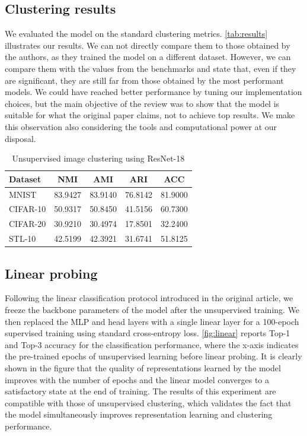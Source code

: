 \documentclass{article}
\begin{document}
\subsection{Clustering results}
We evaluated the model on the standard clustering metrics. \autoref{tab:results} illustrates our results. We can not directly compare them to those obtained by the authors, as they trained the model on a different dataset. However, we can compare them with the values from the benchmarks and state that, even if they are significant, they are still far from those obtained by the most performant models. We could have reached better performance by tuning our implementation choices, but the main objective of the review was to show that the model is suitable for what the original paper claims, not to achieve top results. We make this observation also considering the tools and computational power at our disposal.

\begin{table}[h!]
  \caption{Unsupervised image clustering using ResNet-18}
  \label{tab:results}
  \centering
  \begin{tabular}{lcccc}
    \toprule
    Dataset  & NMI    &  AMI     & ARI   & ACC  \\
    \midrule
    MNIST\cite{mnist}   & 83.9427 & 83.9140 & 76.8142 & 81.9000 \\
    CIFAR-10 \cite{cifar_10} & 50.9317 & 50.8450 & 41.5156 & 60.7300 \\
    CIFAR-20 & 30.9210 & 30.4974 & 17.8501 & 32.2400 \\
    STL-10 \cite{stl_10}  & 42.5199 & 42.3921 & 31.6741 & 51.8125	\\
    \bottomrule
  \end{tabular}
\end{table}

\subsection{Linear probing}
Following the linear classification protocol introduced in the original article, we freeze the backbone parameters of the model after the unsupervised training. We then replaced the MLP and head layers with a single linear layer for a 100-epoch supervised training using standard cross-entropy loss. \autoref{fig:linear} reports Top-1 and Top-3 accuracy for the classification performance, where the x-axis indicates the pre-trained epochs of unsupervised learning before linear probing. It is clearly shown in the figure that the quality of representations learned by the model improves with the number of epochs and the linear model converges to a satisfactory state at the end of training. The results of this experiment are compatible with those of unsupervised clustering, which validates the fact that the model simultaneously improves representation learning and clustering performance.
\end{document}

